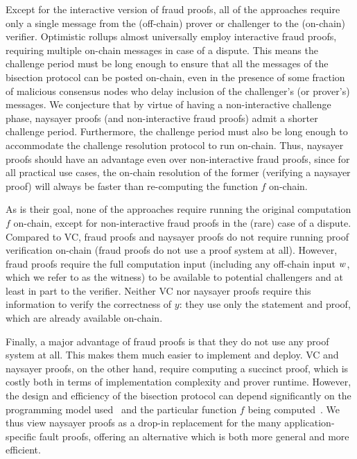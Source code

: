 Except for the interactive version of fraud proofs, all of the approaches require only a single message from the (off-chain) prover or challenger to the (on-chain) verifier. Optimistic rollups almost universally employ interactive fraud proofs, requiring multiple on-chain messages in case of a dispute. This means the challenge period must be long enough to ensure that all the messages of the bisection protocol can be posted on-chain, even in the presence of some fraction of malicious consensus nodes who delay inclusion of the challenger's (or prover's) messages. We conjecture that by virtue of having a non-interactive challenge phase, naysayer proofs (and non-interactive fraud proofs) admit a shorter challenge period. Furthermore, the challenge period must also be long enough to accommodate the challenge resolution protocol to run on-chain. Thus, naysayer proofs should have an advantage even over non-interactive fraud proofs, since for all practical use cases, the on-chain resolution of the former (verifying a naysayer proof) will always be faster than re-computing the function $f$ on-chain.

As is their goal, none of the approaches require running the original computation $f$ on-chain, except for non-interactive fraud proofs in the (rare) case of a dispute. 
Compared to VC, fraud proofs and naysayer proofs do not require running proof verification on-chain (fraud proofs do not use a proof system at all).
However, fraud proofs require the full computation input (including any off-chain input $w$, which we refer to as the witness) to be available to potential challengers and at least in part to the verifier.
 Neither VC nor naysayer proofs require this information to verify the correctness of $y$: they use only the statement and proof, which are already available on-chain.

Finally, a major advantage of fraud proofs is that they do not use any proof system at all. This makes them much easier to implement and deploy. VC and naysayer proofs, on the other hand, require computing a succinct proof, which is costly both in terms of implementation complexity and prover runtime. %
However, the design and efficiency of the bisection protocol can depend significantly on the programming model used~\cite{USENIX:KGCWF18} and the particular function $f$ being computed~\cite{PooDry16,PooBut17,EPRINT:SNBB19,EPRINT:SJSW19}.
We thus view naysayer proofs as a drop-in replacement for the many application-specific fault proofs, offering an alternative which is both more general and more efficient.